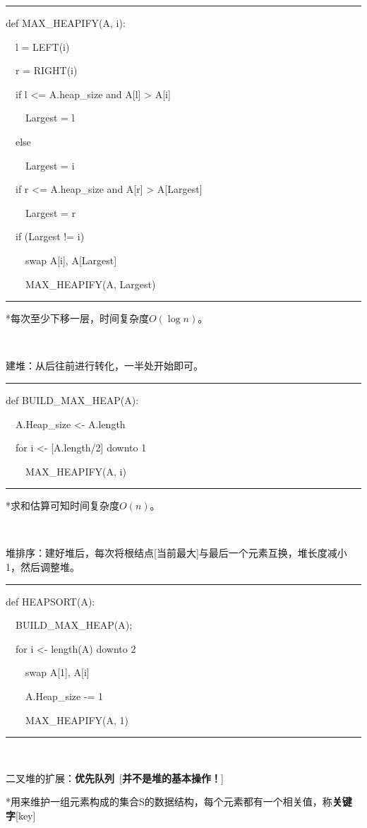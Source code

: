 \documentclass[a4paper,UTF8,fontset=windows]{ctexart}
\newenvironment{code}{\rule{36em}{0.1em}\setlength{\parindent}{1em}

}{

\setlength{\parindent}{0em}\rule{36em}{0.1em}}
\begin{document}
\begin{code}
def MAX\_HEAPIFY(A, i):

\ \ l = LEFT(i)

\ \ r = RIGHT(i)

\ \ if l <= A.heap\_size and A[l] > A[i]

\ \ \ \ Largest = l

\ \ else

\ \ \ \ Largest = i

\ \ if r <= A.heap\_size and A[r] > A[Largest]

\ \ \ \ Largest = r

\ \ if (Largest != i)

\ \ \ \ swap A[i], A[Largest]

\ \ \ \ MAX\_HEAPIFY(A, Largest)
\end{code}

*\hspace{0em}每次至少下移一层，时间复杂度$O(\log n)$。

\

建堆：从后往前进行转化，一半处开始即可。

\begin{code}
def BUILD\_MAX\_HEAP(A):

\ \ A.Heap\_size <- A.length

\ \ for i <- [A.length/2] downto 1

\ \ \ \ MAX\_HEAPIFY(A, i)
\end{code}

*\hspace{0em}求和估算可知时间复杂度$O(n)$。

\

堆排序：建好堆后，每次将根结点[当前最大]与最后一个元素互换，堆长度减小1，然后调整堆。

\begin{code}
def HEAPSORT(A):

\ \ BUILD\_MAX\_HEAP(A);

\ \ for i <- length(A) downto 2

\ \ \ \ swap A[1], A[i]

\ \ \ \ A.Heap\_size -= 1

\ \ \ \ MAX\_HEAPIFY(A, 1)
\end{code}

\

二叉堆的扩展：\textbf{优先队列}\ [\textbf{并不是堆的基本操作！}]

*\hspace{0em}用来维护一组元素构成的集合S的数据结构，每个元素都有一个相关值，称\textbf{关键字}[key]
\end{document}
